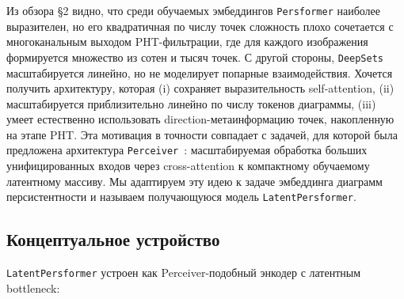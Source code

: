 Из обзора §2 видно, что среди обучаемых эмбеддингов \texttt{Persformer} наиболее выразителен, но его квадратичная по числу точек сложность плохо сочетается с многоканальным выходом PHT-фильтрации, где для каждого изображения формируется множество из сотен и тысяч точек. С другой стороны, \texttt{DeepSets} масштабируется линейно, но не моделирует попарные взаимодействия. Хочется получить архитектуру, которая (i) сохраняет выразительность self-attention, (ii) масштабируется приблизительно линейно по числу токенов диаграммы, (iii) умеет естественно использовать direction-метаинформацию точек, накопленную на этапе PHT. Эта мотивация в точности совпадает с задачей, для которой была предложена архитектура \texttt{Perceiver}~\cite{jaeglePerceiverGeneralPerception2021}: масштабируемая обработка больших унифицированных входов через cross-attention к компактному обучаемому латентному массиву. Мы адаптируем эту идею к задаче эмбеддинга диаграмм персистентности и называем получающуюся модель \texttt{LatentPersformer}.

\subsection{Концептуальное устройство}

\texttt{LatentPersformer} устроен как Perceiver-подобный энкодер с латентным bottleneck:

